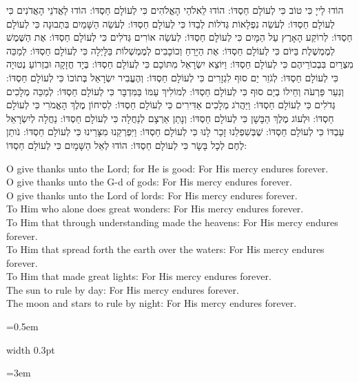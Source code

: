 \documentclass[11pt, openany]{book}
\newlength{\bidiHebWidth}
\newlength{\bidiEngWidth}
\newenvironment{bilingual}{%
  \par\vspace{4pt}%
}{%
  \noindent
  \begin{minipage}[t]{\bidiEngWidth}
    \setstretch{1.4}\emergencystretch=0.5em\normalsize
    \usebox{\bidiEngBox}
  \end{minipage}%
  \hfill
  {\color{sedergold}\vrule width 0.3pt}%
  \hfill
  \begin{minipage}[t]{\bidiHebWidth}
    \begingroup\hebrewfont\TeXXeTstate=1\beginR
    \large\setstretch{1.4}\emergencystretch=3em\tolerance=9999\parindent=0pt\relax
    \usebox{\bidiHebBox}
    \endR\endgroup
  \end{minipage}%
  \par\vspace{2pt}%
}
\newenvironment{hebrewcol}{%
  \begin{lrbox}{\bidiHebBox}\begin{minipage}{\bidiHebWidth}%
}{%
  \end{minipage}\end{lrbox}%
}
\newenvironment{englishcol}{%
  \begin{lrbox}{\bidiEngBox}\begin{minipage}{\bidiEngWidth}%
}{%
  \end{minipage}\end{lrbox}%
}
\begin{document}
\begin{bilingual}
\begin{hebrewcol}
הוֹדוּ לַייָ כִּי טוֹב		כִּי לְעוֹלָם חַסְדּוֹ:
הוֹדוּ לֵאלֹהֵי הָאֱלֹהִים	כִּי לְעוֹלָם חַסְדּוֹ:
הוֹדוּ לַאֲדֹנֵי הָאֲדֹנִים	כִּי לְעוֹלָם חַסְדּוֹ:
לְעֹשֵׂה נִפְלָאוֹת גְּדֹלוֹת לְבַדּוֹ כִּי לְעוֹלָם חַסְדּוֹ:
לְעֹשֵׂה הַשָּׁמַיִם בִּתְבוּנָה	כִּי לְעוֹלָם חַסְדּוֹ:
לְרוֹקַע הָאָרֶץ עַל הַמָּיִם	כִּי לְעוֹלָם חַסְדּוֹ:
לְעֹשֵׂה אוֹרִים גְּדֹלִים	כִּי לְעוֹלָם חַסְדּוֹ:
אֶת הַשֶּׁמֶשׁ לְמֶמְשֶׁלֶת בַּיּוֹם כִּי לְעוֹלָם חַסְדּוֹ:
אֶת הַיָּרֵחַ וְכוֹכָבִים לְמֶמְשְׁלוֹת בַּלָּיְלָה			כִּי לְעוֹלָם חַסְדּוֹ:
לְמַכֵּה מִצְרַיִם בִּבְכוֹרֵיהֶם כִּי לְעוֹלָם חַסְדּוֹ:
וַיּוֹצֵא יִשְׂרָאֵל מִתּוֹכָם	כִּי לְעוֹלָם חַסְדּוֹ:
בְּיָד חֲזָקָה וּבִזְרוֹעַ נְטוּיָה	כִּי לְעוֹלָם חַסְדּוֹ:
לְגֹזֵר יַם סוּף לִגְזָרִים	כִּי לְעוֹלָם חַסְדּוֹ:
וְהֶעֱבִיר יִשְׂרָאֵל בְּתוֹכוֹ	כִּי לְעוֹלָם חַסְדּוֹ:
וְנִעֵר פַּרְעֹה וְחֵילוֹ בְיַם סוּף כִּי לְעוֹלָם חַסְדּוֹ:
לְמוֹלִיךְ עַמּוֹ בַּמִּדְבָּר	כִּי לְעוֹלָם חַסְדּוֹ:
לְמַכֵּה מְלָכִים גְּדֹלִים	כִּי לְעוֹלָם חַסְדּוֹ:
וַיַּהֲרֹג מְלָכִים אַדִּירִים	כִּי לְעוֹלָם חַסְדּוֹ:
לְסִיחוֹן מֶלֶךְ הָאֱמֹרִי	כִּי לְעוֹלָם חַסְדּוֹ:
וּלְעוֹג מֶלֶךְ הַבָּשָׁן	כִּי לְעוֹלָם חַסְדּוֹ:
וְנָתַן אַרְצָם לְנַחֲלָה	כִּי לְעוֹלָם חַסְדּוֹ:
נַחֲלָה לְיִשְׂרָאֵל עַבְדּוֹ	כִּי לְעוֹלָם חַסְדּוֹ:
שֶׁבְּשִׁפְלֵנוּ זָכַר לָנוּ	כִּי לְעוֹלָם חַסְדּוֹ:
וַיִּפְרְקֵנוּ מִצָּרֵינוּ		כִּי לְעוֹלָם חַסְדּוֹ:
נֹותֵן לֶחֶם לְכָל בָּשָׂר	כִּי לְעוֹלָם חַסְדּוֹ:
הוֹדוּ לְאֵל הַשָּׁמָיִם	כִּי לְעוֹלָם חַסְדּוֹ:
\end{hebrewcol}
\begin{englishcol}
O give thanks unto the Lord; for He is good: For His mercy endures forever.\\[2pt]
O give thanks unto the G-d of gods: For His mercy endures forever.\\[2pt]
O give thanks unto the Lord of lords: For His mercy endures forever.\\[2pt]
To Him who alone does great wonders: For His mercy endures forever.\\[2pt]
To Him that through understanding made the heavens: For His mercy endures forever.\\[2pt]
To Him that spread forth the earth over the waters: For His mercy endures forever.\\[2pt]
To Him that made great lights: For His mercy endures forever.\\[2pt]
The sun to rule by day: For His mercy endures forever.\\[2pt]
The moon and stars to rule by night: For His mercy endures forever.\\[2pt]

\end{englishcol}
\end{bilingual}
\end{document}
